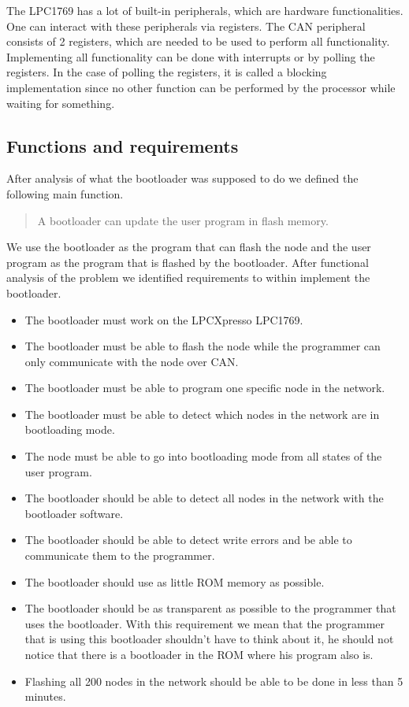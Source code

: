 \documentclass[twocolumn]{article}
\begin{document}
		The LPC1769 has a lot of built-in peripherals,
		which are hardware functionalities.
		One can interact with these peripherals via registers.
		The CAN peripheral consists of 2 registers, which are needed to be used to perform all functionality.
		Implementing all functionality can be done with interrupts or by polling the registers.
		In the case of polling the registers, it is called a blocking implementation since no other function can be performed by the processor while waiting for something.
	
	\subsection*{Functions and requirements}
		After analysis of what the bootloader was supposed to do we defined the following main function.
		\begin{quote}
			A bootloader can update the user program in flash memory.
		\end{quote}
		We use the bootloader as the program that can flash the node and the user program as the program that is flashed by the bootloader.
		After functional analysis of the problem we identified requirements to within implement the bootloader.
		\begin{itemize}
			\item The bootloader must work on the LPCXpresso LPC1769.
			\item The bootloader must be able to flash the node while the programmer can only communicate with the node over CAN.
			\item The bootloader must be able to program one specific node in the network.
			\item The bootloader must be able to detect which nodes in the network are in bootloading mode.
			\item The node must be able to go into bootloading mode from all states of the user program.
			\item The bootloader should be able to detect all nodes in the network with the bootloader software.
			\item The bootloader should be able to detect write errors and be able to communicate them to the programmer.
			\item The bootloader should use as little ROM memory as possible.
			\item The bootloader should be as transparent as possible to the programmer that uses the bootloader.
				With this requirement we mean that the programmer that is using this bootloader shouldn't have to think about it,
				he should not notice that there is a bootloader in the ROM where his program also is.
			\item Flashing all 200 nodes in the network should be able to be done in less than 5 minutes.
		\end{itemize}
		
\end{document}
